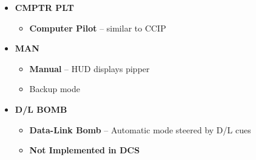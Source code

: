 \documentclass[fontInter]{TechCheck}
\begin{document}
\begin{listlongtable}
\begin{minipage}[t]{\linewidth}
\begin{itemize}
\begin{itemize}
				\end{itemize}
				\item \textbf{CMPTR PLT}
				\begin{itemize}
					\item \textbf{Computer Pilot} -- similar to CCIP
				\end{itemize}
				\item \textbf{MAN}
				\begin{itemize}
					\item \textbf{Manual} -- HUD displays pipper
					\item Backup mode
				\end{itemize}
				\item \textbf{D/L BOMB}
				\begin{itemize}
					\item \textbf{Data-Link Bomb} -- Automatic mode steered by D/L cues
					\item \textbf{Not Implemented in DCS}
				\end{itemize}
			\end{itemize}
		\end{minipage} \\
	\end{listlongtable}
\end{document}

